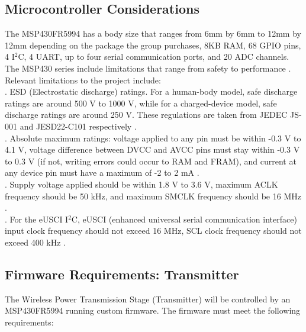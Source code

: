 \documentclass[12pt]{article}
\begin{document}
\subsection{Microcontroller Considerations}

\indent \indent
The MSP430FR5994 has a body size that ranges from 6mm by 6mm to 12mm by 12mm depending on the package the group purchases, 8KB RAM, 68 GPIO pins, 4 I$^2$C, 4 UART, up to four serial communication ports, and 20 ADC channels. The MSP430 series include limitations that range from safety to performance \cite{MSP430FR599x}.\\

\noindent
Relevant limitations to the project include:\\

. ESD (Electrostatic discharge) ratings. For a human-body model, safe discharge ratings are around 500 V to 1000 V, while for a charged-device model, safe discharge ratings are around 250 V. These regulations are taken from JEDEC JS-001 and JESD22-C101 respectively \cite{MSP430FR599x}.\\

. Absolute maximum ratings: voltage applied to any pin must be within -0.3 V to 4.1 V, voltage difference between DVCC and AVCC pins must stay within -0.3 V to 0.3 V (if not, writing errors could occur to RAM and FRAM), and current at any device pin must have a maximum of  -2 to 2 mA \cite{MSP430FR599x}.\\

. Supply voltage applied should be within 1.8 V to 3.6 V, maximum ACLK frequency should be 50 kHz, and maximum SMCLK frequency should be 16 MHz \cite{MSP430FR599x}.\\

. For the eUSCI I$^2$C, eUSCI (enhanced universal serial communication interface) input clock frequency should not exceed 16 MHz, SCL clock frequency should not exceed 400 kHz \cite{MSP430FR599x}.


\subsection{Firmware Requirements: Transmitter}

\indent \indent
The Wireless Power Transmission Stage (Transmitter) will be controlled by an MSP430FR5994 running custom firmware. The firmware must meet the following requirements:\\
\end{document}
